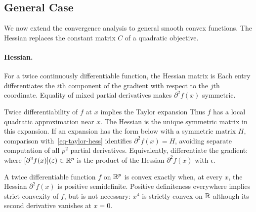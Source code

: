 \subsection{General Case}

We now extend the convergence analysis to general smooth convex functions.
%
The Hessian replaces the constant matrix $C$ of a quadratic objective.

\paragraph{Hessian.}

For a twice continuously differentiable function, the Hessian matrix is
Each entry differentiates the $i$th component of the gradient with respect to the $j$th coordinate. Equality of mixed partial derivatives makes $\partial^2 f(x)$ symmetric.

Twice differentiability of $f$ at $x$ implies the Taylor expansion
Thus $f$ has a local quadratic approximation near $x$.
%
The Hessian is the unique symmetric matrix in this expansion. If an expansion has the form below with a symmetric matrix $H$,
comparison with~\eqref{eq-taylor-hess} identifies $\partial^2 f(x)=H$, avoiding separate computation of all $p^2$ partial derivatives.
%
Equivalently, differentiate the gradient:
where $[\partial^2 f(x)](\varepsilon) \in \mathbb{R}^p$ is the product of the Hessian $\partial^2 f(x)$ with $\epsilon$.

A twice differentiable function $f$ on $\mathbb{R}^p$ is convex exactly when, at every $x$, the Hessian $\partial^2 f(x)$ is positive semidefinite.
% 
Positive definiteness everywhere implies strict convexity of $f$, but is not necessary: $x^4$ is strictly convex on $\mathbb{R}$ although its second derivative vanishes at $x=0$.

